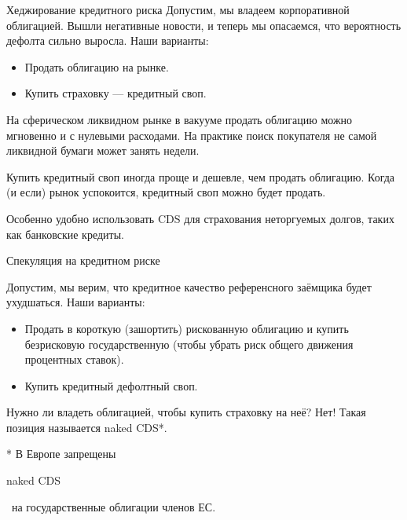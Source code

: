 \documentclass{beamer}
\newcommand{\en}[1]{\begin{otherlanguage}{english}#1\end{otherlanguage}}
\begin{document}
\begin{frame}{Хеджирование кредитного риска}
\justify
Допустим, мы владеем корпоративной облигацией. Вышли негативные новости, и теперь мы опасаемся, что вероятность дефолта сильно выросла. Наши варианты:
\begin{itemize}
\item Продать облигацию на рынке.
\item Купить страховку --- кредитный своп.
\end{itemize}

\justify
На сферическом ликвидном рынке в вакууме продать облигацию можно мгновенно и с нулевыми расходами. На практике поиск покупателя не самой ликвидной бумаги может занять недели.

\justify
Купить кредитный своп иногда проще и дешевле, чем продать облигацию. Когда (и если) рынок успокоится, кредитный своп можно будет продать.

\justify
Особенно удобно использовать CDS для страхования неторгуемых долгов, таких как банковские кредиты.
\end{frame}



\begin{frame}{Спекуляция на кредитном риске}

\justify
Допустим, мы верим, что кредитное качество референсного заёмщика будет ухудшаться. Наши варианты:
\begin{itemize}
\justifying
\item Продать в короткую (зашортить) рискованную облигацию и купить безрисковую государственную (чтобы убрать риск общего движения процентных ставок).
\item Купить кредитный дефолтный своп.
\end{itemize}

\justify
Нужно ли владеть облигацией, чтобы купить страховку на неё? Нет! Такая позиция называется naked CDS*.

\justify
* В Европе запрещены \en{naked CDS}\ на государственные облигации членов ЕС.
\end{frame}


\renewcommand{\swapPartyNode}[4]{

	\draw (#1, #2)
		node[
			rectangle,
			draw,
			rounded corners,
			anchor = south,
			minimum height = 0.8cm,
			minimum width = 2.8cm
		]
		(#4)
		{#3};
}

\newcommand{\paymentFlow}[4] {
	\draw [
		->,
		>=triangle 90
	]
	(#1) -- (#2)
	node[
		pos = 0.5,
		anchor = #4
	]
	{#3};
}
\end{document}
